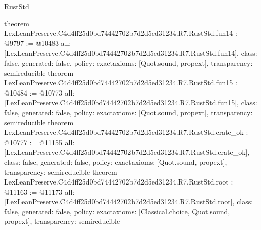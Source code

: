 \begin{lexlean}{RustStd}
\begin{coremodule}
{}
theorem LexLeanPreserve.C4d4ff25d0bd74442702b7d2d5ed31234.R7.RustStd.fun14 : @9797 := @10483 {
  all: [LexLeanPreserve.C4d4ff25d0bd74442702b7d2d5ed31234.R7.RustStd.fun14],
  class: false,
  generated: false,
  policy: exact{axioms: [Quot.sound, propext]},
  transparency: semireducible
}
theorem LexLeanPreserve.C4d4ff25d0bd74442702b7d2d5ed31234.R7.RustStd.fun15 : @10484 := @10773 {
  all: [LexLeanPreserve.C4d4ff25d0bd74442702b7d2d5ed31234.R7.RustStd.fun15],
  class: false,
  generated: false,
  policy: exact{axioms: [Quot.sound, propext]},
  transparency: semireducible
}
theorem LexLeanPreserve.C4d4ff25d0bd74442702b7d2d5ed31234.R7.RustStd.crate_ok : @10777 := @11155 {
  all: [LexLeanPreserve.C4d4ff25d0bd74442702b7d2d5ed31234.R7.RustStd.crate_ok],
  class: false,
  generated: false,
  policy: exact{axioms: [Quot.sound, propext]},
  transparency: semireducible
}
theorem LexLeanPreserve.C4d4ff25d0bd74442702b7d2d5ed31234.R7.RustStd.root : @11163 := @11173 {
  all: [LexLeanPreserve.C4d4ff25d0bd74442702b7d2d5ed31234.R7.RustStd.root],
  class: false,
  generated: false,
  policy: exact{axioms: [Classical.choice, Quot.sound, propext]},
  transparency: semireducible
}


\end{coremodule}
\end{lexlean}
